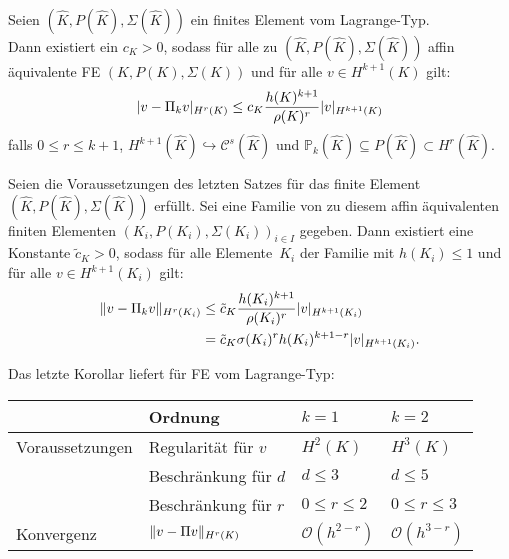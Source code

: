 \documentclass{cheat-sheet}
\newcommand{\Cont}{\mathcal{C}} %
\renewcommand{\O}{\mathcal{O}} %
\begin{document}
\begin{satz} \mbox{} \\
  Seien $(\hat{K}, P(\hat{K}), \Sigma(\hat{K}))$ ein finites Element vom Lagrange-Typ. \\
  Dann existiert ein $c_K > 0$, sodass für alle zu $(\hat{K}, P(\hat{K}), \Sigma (\hat{K}))$ affin äquivalente FE $(K, P(K), \Sigma(K))$ und für alle $v \in H^{k+1}(K)$ gilt:
  \[
    \lvert v - \Pi_k v\rvert_{H^r(K)} \leq c_K \frac{h(K)^{k+1}}{\rho(K)^r} \lvert v\rvert_{H^{k+1}(K)}
  \]
  falls $0 \leq r \leq k+1$, $H^{k+1}(\hat{K}) \hookrightarrow \Cont^s(\hat{K})$ und $\mathbb{P}_k(\hat{K}) \subseteq P(\hat{K}) \subset H^r(\hat{K})$.
\end{satz}



\begin{kor}
  Seien die Voraussetzungen des letzten Satzes für das finite Element $(\hat{K}, P(\hat{K}), \Sigma(\hat{K}))$ erfüllt.
  Sei eine Familie von zu diesem affin äquivalenten finiten Elementen $(K_i, P(K_i), \Sigma(K_i))_{i \in I}$ gegeben.
  Dann existiert eine Konstante $\tilde{c}_K > 0$, sodass für alle Elemente~$K_i$ der Familie mit $h(K_i) \leq 1$ und für alle $v \in H^{k+1}(K_i)$ gilt:
  \begin{align*}
    \lVert v - \Pi_k v\rVert_{H^r(K_i)} & \leq \tilde{c}_K \frac{h(K_i)^{k+1}}{\rho(K_i)^r} \lvert v\rvert_{H^{k+1}(K_i)} \\
    & = \tilde{c}_K \sigma(K_i)^r h(K_i)^{k+1-r} \lvert v\rvert_{H^{k+1}(K_i)}.
  \end{align*}
\end{kor}


\begin{bspe}
  Das letzte Korollar liefert für FE vom Lagrange-Typ:
  
  \begin{tabular}[t]{l l l l}
    & Ordnung & $k=1$ & $k=2$ \\ \hline
    Voraussetzungen & Regularität für $v$ & $H^2(K)$ & $H^3(K)$ \\
    & Beschränkung für $d$ & $d \leq 3$ & $d \leq 5$ \\
    & Beschränkung für $r$ & $0 \leq r \leq 2$ & $0 \leq r \leq 3$ \\ \hline
    Konvergenz & $\lVert v - \Pi v\rVert_{H^r(K)}$ & $\O(h^{2-r})$ & $\O(h^{3-r})$
  \end{tabular}
\end{bspe}
\end{document}
